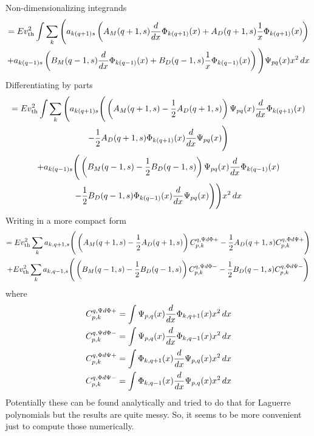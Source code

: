 \documentclass{article}[draft]
\begin{document}
Non-dimensionalizing integrands
\begin{multline*}
= E \vth^2
\myint 
\sum_{k}
\Bigg(
a_{k(q+1)s} 
\left( A_M\of{q+1,s} \frac{d}{dx}\Phi_{k(q+1)}\of{x} 
+ A_D\of{q+1,s} \frac{1}{x}\Phi_{k(q+1)}\of{x} \right)
\\
+ a_{k(q-1)s} \left( B_M\of{q-1,s} \frac{d}{dx}\Phi_{k(q-1)}\of{x} 
+ B_D\of{q-1,s} \frac{1}{x}\Phi_{k(q-1)}\of{x} \right)
\Bigg)
\Psi_{pq}\of{x}
x^2 \diff{x}
\end{multline*}
Differentiating by parts
\begin{multline*}
= E \vth^2
\myint 
\sum_{k}
\Bigg(
a_{k(q+1)s} \Bigg( 
\left( A_M\of{q+1,s} - \frac12 A_D\of{q+1,s} \right) 
\Psi_{pq}\of{x} \frac{d}{dx}\Phi_{k(q+1)}\of{x} 
\\
- \frac12 A_D\of{q+1,s} \Phi_{k(q+1)}\of{x} \frac{d}{dx} \Psi_{pq}\of{x} \Bigg)
\\
+ a_{k(q-1)s} \Bigg( 
\left( B_M\of{q-1,s} - \frac12 B_D\of{q-1,s} \right) \Psi_{pq}\of{x} \frac{d}{dx}\Phi_{k(q-1)}\of{x} 
\\
- \frac12 B_D\of{q-1,s} \Phi_{k(q-1)}\of{x} \frac{d}{dx}\Psi_{pq}\of{x}
\Bigg)
\Bigg)
x^2 \diff{x}
\end{multline*}
Writing in a more compact form
\begin{multline*}
= E \vth^2 \sum_{k}
a_{k,q+1,s} \Bigg( 
\left( A_M\of{q+1,s} - \frac12 A_D\of{q+1,s} \right) 
C^{q,\Psi d\Phi+}_{p,k} 
- \frac12 A_D\of{q+1,s} C^{q,\Phi d\Psi+}_{p,k} \Bigg)
\\
+ E \vth^2 \sum_{k}
a_{k,q-1,s} \Bigg( 
\left( B_M\of{q-1,s} - \frac12 B_D\of{q-1,s} \right) C^{q,\Psi d\Phi-}_{p,k}
- \frac12 B_D\of{q-1,s} C^{q,\Phi d\Psi-}_{p,k}
\Bigg)
\end{multline*}
where
\begin{align*}
C^{q,\Psi d\Phi+}_{p,k} 
&= \myint \Psi_{p,q}\of{x} \frac{d}{dx} \Phi_{k,q+1}\of{x} x^2 \diff{x}
\\
C^{q,\Psi d\Phi-}_{p,k} 
&= \myint \Psi_{p,q}\of{x} \frac{d}{dx} \Phi_{k,q-1}\of{x} x^2 \diff{x}
\\
C^{q,\Phi d\Psi+}_{p,k} 
&= \myint \Phi_{k,q+1}\of{x} \frac{d}{dx} \Psi_{p,q}\of{x} x^2 \diff{x}
\\
C^{q,\Phi d\Psi-}_{p,k} 
&= \myint \Phi_{k,q-1}\of{x} \frac{d}{dx} \Psi_{p,q}\of{x} x^2 \diff{x}
\end{align*}
Potentially these can be found analytically and tried to do that for Laguerre polynomials but the results are quite messy. So, it seems to be more convenient just to compute those numerically.
\end{document}
